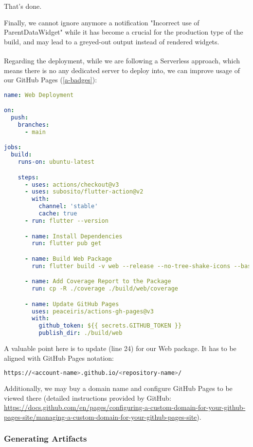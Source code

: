 \noindent That's done.

Finally, we cannot ignore anymore a notification "Incorrect use of ParentDataWidget" while it has become a crucial for 
the production type of the build, and may lead to a greyed-out output instead of rendered widgets.\\
\\

Regarding the deployment, while we are following a Serverless approach, which means there is no any dedicated server to 
deploy into, we can improve usage of our GitHub Pages (\ref{a-badges}):

\begin{lstlisting}[language=yaml]
name: Web Deployment

on:
  push:
    branches:
      - main

jobs:
  build:
    runs-on: ubuntu-latest

    steps:
      - uses: actions/checkout@v3
      - uses: subosito/flutter-action@v2
        with:
          channel: 'stable'
          cache: true
      - run: flutter --version

      - name: Install Dependencies
        run: flutter pub get

      - name: Build Web Package
        run: flutter build -v web --release --no-tree-shake-icons --base-href="/app-finance/"

      - name: Add Coverage Report to the Package
        run: cp -R ./coverage ./build/web/coverage

      - name: Update GitHub Pages 
        uses: peaceiris/actions-gh-pages@v3
        with:
          github_token: ${{ secrets.GITHUB_TOKEN }}
          publish_dir: ./build/web
\end{lstlisting}

\noindent A valuable point here is to update  (line 24) for our Web package. It has to be aligned with 
GitHub Pages notation:

\begin{lstlisting}[language=bash]
https://<account-name>.github.io/<repository-name>/
\end{lstlisting}

Additionally, we may buy a domain name and configure GitHub Pages to be viewed there (detailed instructions provided by
GitHub: \href{https://docs.github.com/en/pages/configuring-a-custom-domain-for-your-github-pages-site/managing-a-custom-domain-for-your-github-pages-site}{https://docs.github.com/en/pages/configuring-a-custom-domain-for-your-github-pages-site/managing-a-custom-domain-for-your-github-pages-site}).


\subsubsection{Generating Artifacts}

